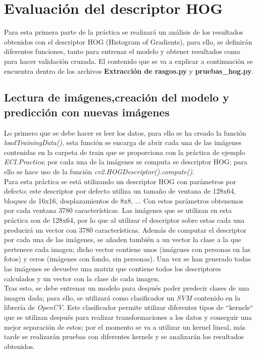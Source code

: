 \chapter{Evaluación del descriptor HOG}
Para esta primera parte de la práctica se realizará un análisis de los resultados obtenidos con el descriptor HOG (Histogram of Gradients), para ello, se definirán diferentes funciones, tanto para entrenar el modelo y obtener resultados como para hacer validación cruzada. El contenido que se va a explicar a continuación se encuentra dentro de los archivos \textbf{Extracción de rasgos.py} y \textbf{pruebas\_hog.py}.

\section{Lectura de imágenes,creación del modelo y predicción con nuevas imágenes}
Lo primero que se debe hacer es leer los datos, para ello se ha creado la función \textit{loadTrainingData()}, esta función se encarga de abrir cada una de las imágenes contenidas en la carpeta de train que se proporciona con la práctica de ejemplo \textit{ECI.Practica}; por cada una de la imágenes se computa se descriptor HOG; para ello se hace uso de la función \textit{cv2.HOGDescriptor().compute()}. \\

Para esta práctica se está utilizando un descriptor HOG con parámetros por defecto; este descriptor por defecto utiliza un tamaño de ventana de 128x64, bloques de 16x16, desplazamientos de 8x8, ... Con estos parámetros obtenemos por cada ventana 3780 características. Las imágenes que se utilizan en esta práctica son de 128x64, por lo que al utilizar el descriptor sobre estas cada una producirá un vector con 3780 características. Además de computar el descriptor por cada una de las imágenes, se añaden también a un vector la clase a la que pertenece cada imagen; dicho vector contiene unos (imágenes con personas en las fotos) y ceros (imágenes con fondo, sin personas). Una vez se han generado todas las imágenes se devuelve una matriz que contiene todos los descriptores calculados y un vector con la clase de cada imagen. \\

Tras esto, se debe entrenar un modelo para después poder predecir clases de una imagen dada; para ello, se utilizará como clasificador un \textit{SVM} contenido en la librería de \textit{OpenCV}. Este clasificador permite utilizar diferentes tipos de ``kernels`` que se utilizan después para realizar transformaciones a los datos y conseguir una mejor separación de estos; por el momento se va a utilizar un kernel lineal, más tarde se realizarán pruebas con diferentes kernels y se analizarán los resultados obtenidos.\\


